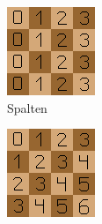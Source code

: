 \begin{figure}
  \centering
  \begin{subfigure}{0.3\linewidth}
    \includegraphics[width=\linewidth]{../img/columns.png}
    \caption{Spalten}
  \end{subfigure}
  \begin{subfigure}{0.3\linewidth}
    \includegraphics[width=\linewidth]{../img/left_diagonals.png}

\end{subfigure}
\end{figure}
